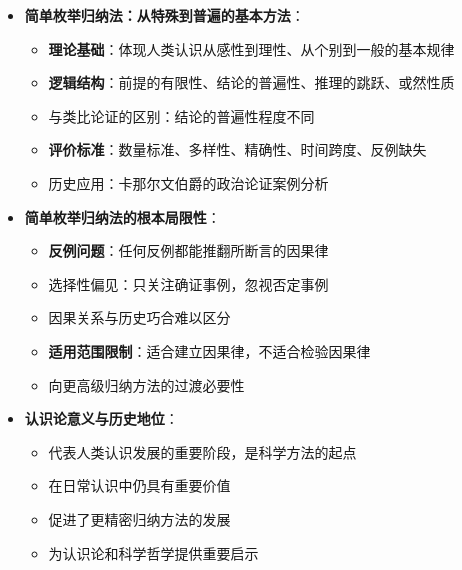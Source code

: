 \begin{center}
{{\begin{itemize}
\begin{itemize}
  \item \textbf{休谟问题}：从有限经验如何推出无限普遍性的认识论挑战
  \item 因果关系的经验性质：只能后验发现，不能先验推导
  \item 经验局限性与归纳推理挑战的深层分析
  \end{itemize}
\item \textbf{简单枚举归纳法：从特殊到普遍的基本方法}：
  \begin{itemize}
  \item \textbf{理论基础}：体现人类认识从感性到理性、从个别到一般的基本规律
  \item \textbf{逻辑结构}：前提的有限性、结论的普遍性、推理的跳跃、或然性质
  \item 与类比论证的区别：结论的普遍性程度不同
  \item \textbf{评价标准}：数量标准、多样性、精确性、时间跨度、反例缺失
  \item 历史应用：卡那尔文伯爵的政治论证案例分析
  \end{itemize}
\item \textbf{简单枚举归纳法的根本局限性}：
  \begin{itemize}
  \item \textbf{反例问题}：任何反例都能推翻所断言的因果律
  \item 选择性偏见：只关注确证事例，忽视否定事例
  \item 因果关系与历史巧合难以区分
  \item \textbf{适用范围限制}：适合建立因果律，不适合检验因果律
  \item 向更高级归纳方法的过渡必要性
  \end{itemize}
\item \textbf{认识论意义与历史地位}：
  \begin{itemize}
  \item 代表人类认识发展的重要阶段，是科学方法的起点
  \item 在日常认识中仍具有重要价值
  \item 促进了更精密归纳方法的发展
  \item 为认识论和科学哲学提供重要启示
  \end{itemize}
\end{itemize}
}}
\end{center}